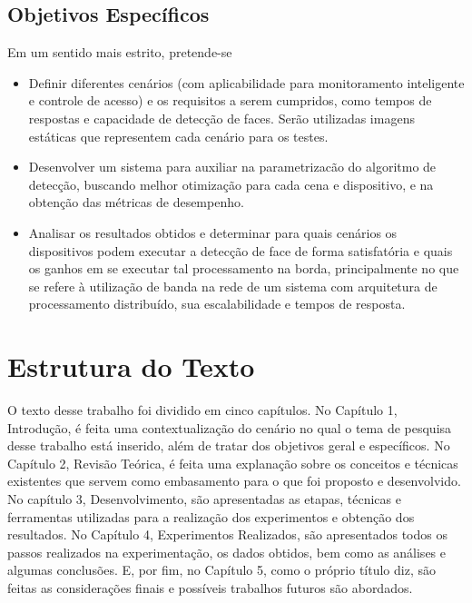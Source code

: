 \subsection{Objetivos Específicos}
Em um sentido mais estrito, pretende-se
\begin{itemize}
    \item Definir diferentes cenários (com aplicabilidade para monitoramento inteligente e controle de acesso) e os requisitos a serem cumpridos, como tempos de respostas e capacidade de detecção de faces. Serão utilizadas imagens estáticas que representem cada cenário para os testes.
    \item Desenvolver um sistema para auxiliar na parametrizacão do algoritmo de detecção, buscando melhor otimização para cada cena e dispositivo, e na obtenção das métricas de desempenho.
    \item Analisar os resultados obtidos e determinar para quais cenários os dispositivos podem executar a detecção de face de forma satisfatória e quais os ganhos em se executar tal processamento na borda, principalmente no que se refere à utilização de banda na rede de um sistema com arquitetura de processamento distribuído, sua escalabilidade e tempos de resposta.
\end{itemize}

\section{Estrutura do Texto}
O texto desse trabalho foi dividido em cinco capítulos. No Capítulo 1, Introdução, é feita uma contextualização do cenário no qual o tema de pesquisa desse trabalho está inserido, além de tratar dos objetivos geral e específicos. No Capítulo 2, Revisão Teórica, é feita uma explanação sobre os conceitos e técnicas existentes que servem como embasamento para o que foi proposto e desenvolvido. No capítulo 3, Desenvolvimento, são apresentadas as etapas, técnicas e ferramentas utilizadas para a realização dos experimentos e obtenção dos resultados. No Capítulo 4, Experimentos Realizados, são apresentados todos os passos realizados na experimentação, os dados obtidos, bem como as análises e algumas conclusões. E, por fim, no Capítulo 5, como o próprio título diz, são feitas as considerações finais e possíveis trabalhos futuros são abordados.
